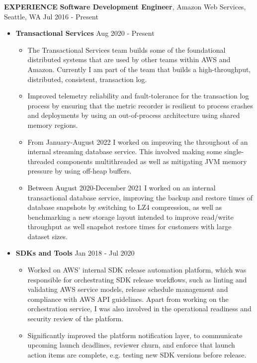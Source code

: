 \documentclass[10pt, a4paper]{article}
\begin{document}
\textbf{EXPERIENCE}
\smallskip
\newline
\textbf{Software Development Engineer}, Amazon Web Services, Seattle, WA \hfill Jul 2016 - Present
\begin{itemize}
\item \textbf{Transactional Services} \hfill Aug 2020 - Present
  \begin{itemize}[label=$\bullet$]
  \item The Transactional Services team builds some of the foundational distributed systems that are used by other teams within AWS and Amazon. Currently I am part of the team that builds a high-throughput, distributed, consistent, transaction log.
  \item Improved telemetry reliability and fault-tolerance for the transaction log process by ensuring that the metric recorder is resilient to process crashes and deployments by using an out-of-process architecture using shared memory regions.
  \item From January-August 2022 I worked on improving the throughout of an internal streaming database service. This involved making some single-threaded components multithreaded as well as mitigating JVM memory pressure by using off-heap buffers.
  \item Between August 2020-December 2021 I worked on an internal transactional database service, improving the backup and restore times of database snapshots by switching to LZ4 compression, as well as benchmarking a new storage layout intended to improve read/write throughput as well snapshot restore times for customers with large dataset sizes.
  \end{itemize}
\item \textbf{SDKs and Tools} \hfill Jan 2018 - Jul 2020
  \begin{itemize}[label=$\bullet$]
  \item Worked on AWS' internal SDK release automation platform, which was responsible for orchestrating SDK release workflows, such as linting and validating AWS service models, release schedule management and compliance with AWS API guidelines. Apart from working on the orchestration service, I was also involved in the operational readiness and security review of the platform.
  \item Significantly improved the platform notification layer, to communicate upcoming launch deadlines, reviewer churn, and enforce that launch action items are complete, e.g. testing new SDK versions before release.

\end{itemize}
\end{itemize}
\end{document}

